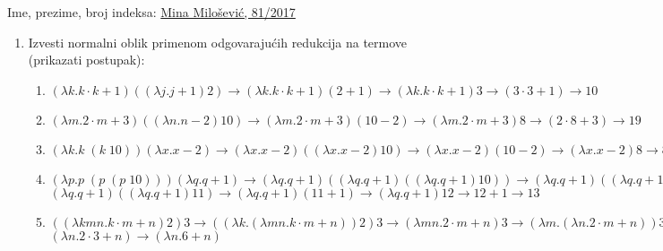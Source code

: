 \documentclass[a4paper]{article}
\date{}
\begin{document}
\noindent Ime, prezime, broj indeksa: \underline{Mina Milošević, 81/2017} \\


\begin{enumerate}
\item Izvesti normalni oblik primenom odgovarajućih redukcija na termove (prikazati postupak):
\begin{enumerate}
\item $(\lambda k.k \cdot k+1)((\lambda j.j+1)2) \rightarrow
(\lambda k.k \cdot k+1)(2+1) \rightarrow (\lambda k.k \cdot k+1)3 \rightarrow
(3 \cdot 3 + 1) \rightarrow 10$  \vspace*{4mm}\\

\item $(\lambda m.2 \cdot m+3)((\lambda n.n-2)10) \rightarrow 
(\lambda m.2 \cdot m+3)(10-2) \rightarrow (\lambda m.2 \cdot m+3)8 \rightarrow
(2 \cdot 8 + 3) \rightarrow 19$ \vspace*{4mm}\\

\item $(\lambda k.k \; (k \; 10))(\lambda x.x-2) \rightarrow 
(\lambda x.x-2)((\lambda x.x-2)10) \rightarrow (\lambda x.x-2)(10-2) \rightarrow
(\lambda x.x-2)8 \rightarrow 8-2 \rightarrow 6$ \vspace*{4mm} \\

\item $(\lambda p.p \; (p \;(p \; 10)))(\lambda q.q+1) \rightarrow 
(\lambda q.q+1)((\lambda q.q+1)((\lambda q.q+1)10)) \rightarrow
(\lambda q.q+1)((\lambda q.q+1)(10+1)) \rightarrow$ \vspace*{3mm}\\
$(\lambda q.q+1)((\lambda q.q+1)11) \rightarrow
(\lambda q.q+1)(11+1) \rightarrow (\lambda q.q+1)12 \rightarrow 12 + 1 
\rightarrow 13$ \vspace*{4mm}\\

\item $((\lambda kmn.k \cdot m+n)2)3 \rightarrow 
((\lambda k.(\lambda mn.k \cdot m+n))2)3 \rightarrow
(\lambda mn.2 \cdot m + n)3 \rightarrow
(\lambda m.(\lambda n.2 \cdot m + n))3 \rightarrow$  \vspace*{3mm}\\
$ (\lambda n.2 \cdot 3 + n) \rightarrow (\lambda n.6 + n) $ \vspace*{4mm}\\


\end{enumerate}
\end{enumerate}
\end{document}
